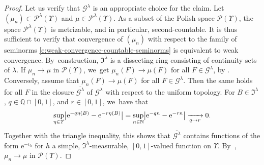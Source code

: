 \documentclass[10pt]{amsart}
\theoremstyle{definition}
\theoremstyle{remark}
\DeclarePairedDelimiter{\abs}{\lvert}{\rvert}
\begin{document}
\begin{proof}
Let us verify that $\mathscr{G}^{\lambda}$ is an appropriate choice for the claim.
Let $(\mu_{n}) \subset \mathscr{P}^{\lambda}(\varUpsilon)$ and $\mu \in \mathscr{P}^{\lambda}(\varUpsilon)$.
As a subset of the Polish space $\mathscr{P}(\varUpsilon)$, the space $\mathscr{P}^{\lambda}(\varUpsilon)$ is metrizable, and in particular, second-countable.
It is thus sufficient to verify that convergence of $(\mu_{n})$ with respect to the family of seminorms \cref{e:weak-convergence-countable-seminorms} is equivalent to weak convergence.
By~construction, $\mathfrak{I}^{\lambda}$ is a dissecting ring consisting of continuity sets of $\lambda$.
If $\mu_{n} \to \mu$ in $\mathscr{P}(\varUpsilon)$, we~get $\mu_{n}(F) \to \mu(F)$ for all $F \in \mathscr{G}^{\lambda}$, by \cite[Th.\,4.11(iii)]{Kallenberg}.
Conversely, assume that $\mu_{n}(F) \to \mu(F)$ for all $F \in \mathscr{G}^{\lambda}$.
Then the same holds for all $F$ in the closure $\overline{\mathscr{G}^{\lambda}}$ of $\mathscr{G}^{\lambda}$ with respect to the uniform topology.
For $B \in \mathfrak{I}^{\lambda}$, $q \in \mathbb{Q} \cap [0,1]$, and $r \in [0,1]$, we~have that
\begin{equation*}
\sup_{\eta \in \varUpsilon} \abs[\big]{\mathrm{e}^{-q \eta(B)} - \mathrm{e}^{-r \eta(B)}} = \sup_{n \in \mathbb{N}} \abs[\big]{\mathrm{e}^{-qn} - \mathrm{e}^{-rn}} \xrightarrow[q \to r]{} 0.
\end{equation*}
Together with the triangle inequality, this shows that $\overline{\mathscr{G}^{\lambda}}$ contains functions of the form $\mathrm{e}^{-\iota_{h}}$ for $h$ a simple, $\mathfrak{I}^{\lambda}$-measurable, $[0,1]$-valued function on $\varUpsilon$.
By~\cite[Th.\,4.11]{Kallenberg}, $\mu_{n} \to \mu$ in $\mathscr{P}(\varUpsilon)$.
\end{proof}
\end{document}
